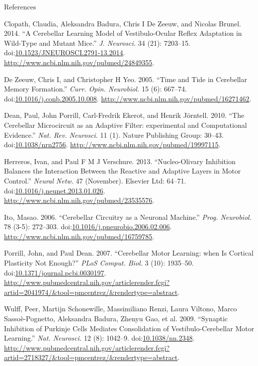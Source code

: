 \documentclass[ignorenonframetext,]{beamer}
\begin{document}
\begin{frame}{References}

Clopath, Claudia, Aleksandra Badura, Chris I {De Zeeuw}, and Nicolas
Brunel. 2014. ``A Cerebellar Learning Model of Vestibulo-Ocular Reflex
Adaptation in Wild-Type and Mutant Mice.'' \emph{J. Neurosci.} 34 (21):
7203--15.
doi:\href{http://dx.doi.org/10.1523/JNEUROSCI.2791-13.2014}{10.1523/JNEUROSCI.2791-13.2014}.
\url{http://www.ncbi.nlm.nih.gov/pubmed/24849355}.

{De Zeeuw}, Chris I, and Christopher H Yeo. 2005. ``Time and Tide in
Cerebellar Memory Formation.'' \emph{Curr. Opin. Neurobiol.} 15 (6):
667--74.
doi:\href{http://dx.doi.org/10.1016/j.conb.2005.10.008}{10.1016/j.conb.2005.10.008}.
\url{http://www.ncbi.nlm.nih.gov/pubmed/16271462}.

Dean, Paul, John Porrill, Carl-Fredrik Ekerot, and Henrik Jörntell.
2010. ``The Cerebellar Microcircuit as an Adaptive Filter: experimental
and Computational Evidence.'' \emph{Nat. Rev. Neurosci.} 11 (1). Nature
Publishing Group: 30--43.
doi:\href{http://dx.doi.org/10.1038/nrn2756}{10.1038/nrn2756}.
\url{http://www.ncbi.nlm.nih.gov/pubmed/19997115}.

Herreros, Ivan, and Paul F M J Verschure. 2013. ``Nucleo-Olivary
Inhibition Balances the Interaction Between the Reactive and Adaptive
Layers in Motor Control.'' \emph{Neural Netw.} 47 (November). Elsevier
Ltd: 64--71.
doi:\href{http://dx.doi.org/10.1016/j.neunet.2013.01.026}{10.1016/j.neunet.2013.01.026}.
\url{http://www.ncbi.nlm.nih.gov/pubmed/23535576}.

Ito, Masao. 2006. ``Cerebellar Circuitry as a Neuronal Machine.''
\emph{Prog. Neurobiol.} 78 (3-5): 272--303.
doi:\href{http://dx.doi.org/10.1016/j.pneurobio.2006.02.006}{10.1016/j.pneurobio.2006.02.006}.
\url{http://www.ncbi.nlm.nih.gov/pubmed/16759785}.

Porrill, John, and Paul Dean. 2007. ``Cerebellar Motor Learning: when Is
Cortical Plasticity Not Enough?'' \emph{PLoS Comput. Biol.} 3 (10):
1935--50.
doi:\href{http://dx.doi.org/10.1371/journal.pcbi.0030197}{10.1371/journal.pcbi.0030197}.
\url{http://www.pubmedcentral.nih.gov/articlerender.fcgi?artid=2041974/\&tool=pmcentrez/\&rendertype=abstract}.

Wulff, Peer, Martijn Schonewille, Massimiliano Renzi, Laura Viltono,
Marco Sassoè-Pognetto, Aleksandra Badura, Zhenyu Gao, et al. 2009.
``Synaptic Inhibition of Purkinje Cells Mediates Consolidation of
Vestibulo-Cerebellar Motor Learning.'' \emph{Nat. Neurosci.} 12 (8):
1042--9. doi:\href{http://dx.doi.org/10.1038/nn.2348}{10.1038/nn.2348}.
\url{http://www.pubmedcentral.nih.gov/articlerender.fcgi?artid=2718327/\&tool=pmcentrez/\&rendertype=abstract}.

\end{frame}
\end{document}
